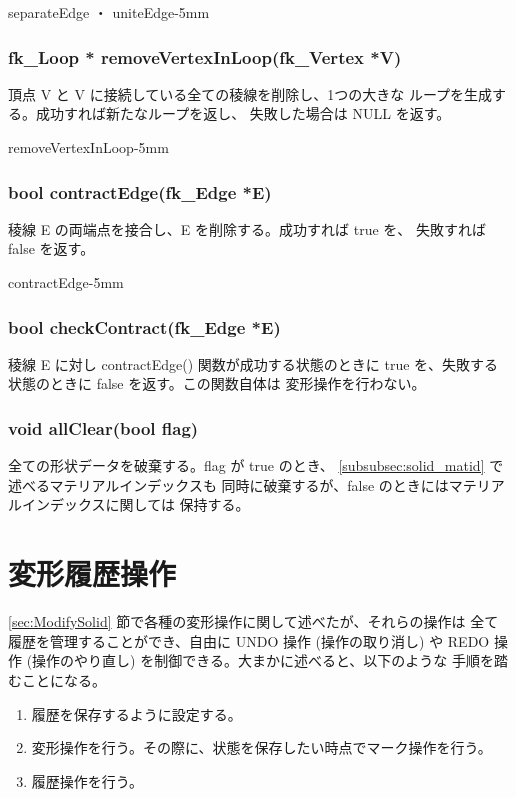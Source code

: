 	{separateEdge ・ uniteEdge}{-5mm}

 \subsubsection*{\hspace*{0.6cm}fk\_Loop * removeVertexInLoop(fk\_Vertex *V)}
	頂点 V と V に接続している全ての稜線を削除し、1つの大きな
	ループを生成する。成功すれば新たなループを返し、
	失敗した場合は NULL を返す。

	{removeVertexInLoop}{-5mm}

 \subsubsection*{\hspace*{0.6cm}bool contractEdge(fk\_Edge *E)}
	稜線 E の両端点を接合し、E を削除する。成功すれば true を、
	失敗すれば false を返す。

	{contractEdge}{-5mm}

 \subsubsection{\hspace*{0.6cm}bool checkContract(fk\_Edge *E)}
	稜線 E に対し contractEdge() 関数が成功する状態のときに
	true を、失敗する状態のときに false を返す。この関数自体は
	変形操作を行わない。

 \subsubsection{\hspace*{0.6cm}void allClear(bool flag)}
	全ての形状データを破棄する。flag が true のとき、
	\ref{subsubsec:solid_matid} で述べるマテリアルインデックスも
	同時に破棄するが、false のときにはマテリアルインデックスに関しては
	保持する。

\section{変形履歴操作}
\ref{sec:ModifySolid} 節で各種の変形操作に関して述べたが、それらの操作は
全て履歴を管理することができ、自由に UNDO 操作 (操作の取り消し) や
REDO 操作 (操作のやり直し) を制御できる。大まかに述べると、以下のような
手順を踏むことになる。
\begin{enumerate}
 \item 履歴を保存するように設定する。
 \item 変形操作を行う。その際に、状態を保存したい時点でマーク操作を行う。
 \item 履歴操作を行う。
\end{enumerate}

